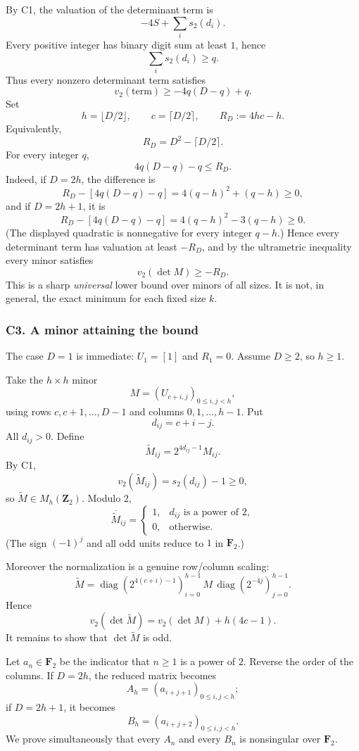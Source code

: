 \documentclass[
  10pt,
  letterpaper,
]{article}
\theoremstyle{definition}
\theoremstyle{remark}
\begin{document}
By C1, the valuation of the determinant term is \[
-4S+\sum_i s_2(d_i).
\] Every positive integer has binary digit sum at least \(1\), hence \[
\sum_i s_2(d_i)\ge q.
\] Thus every nonzero determinant term satisfies \[
v_2(\text{term})
\ge -4q(D-q)+q.
\] Set \[
h=\lfloor D/2\rfloor,
\qquad c=\lceil D/2\rceil,
\qquad
R_D:=4hc-h.
\] Equivalently, \[
\boxed{R_D=D^2-\lceil D/2\rceil.}
\] For every integer \(q\), \[
4q(D-q)-q\le R_D.
\] Indeed, if \(D=2h\), the difference is \[
R_D-[4q(D-q)-q]
=4(q-h)^2+(q-h)\ge0,
\] and if \(D=2h+1\), it is \[
R_D-[4q(D-q)-q]
=4(q-h)^2-3(q-h)\ge0.
\] (The displayed quadratic is nonnegative for every integer \(q-h\).)
Hence every determinant term has valuation at least \(-R_D\), and by the
ultrametric inequality every minor satisfies \[
\boxed{
v_2(\det M)\ge -R_D.
}
\] This is a sharp \emph{universal} lower bound over minors of all
sizes. It is not, in general, the exact minimum for each fixed size
\(k\).

\subsubsection{C3. A minor attaining the
bound}\label{c3.-a-minor-attaining-the-bound}

The case \(D=1\) is immediate: \(U_1=[1]\) and \(R_1=0\). Assume
\(D\ge2\), so \(h\ge1\).

Take the \(h\times h\) minor \[
M=(U_{c+i,j})_{0\le i,j<h},
\] using rows \(c,c+1,\ldots,D-1\) and columns \(0,1,\ldots,h-1\). Put
\[
d_{ij}=c+i-j.
\] All \(d_{ij}>0\). Define \[
\widetilde M_{ij}=2^{4d_{ij}-1}M_{ij}.
\] By C1, \[
v_2(\widetilde M_{ij})=s_2(d_{ij})-1\ge0,
\] so \(\widetilde M\in M_h(\mathbf Z_2)\). Modulo \(2\), \[
\overline{\widetilde M}_{ij}
=
\begin{cases}
1,&d_{ij}\text{ is a power of }2,\\
0,&\text{otherwise}.
\end{cases}
\] (The sign \((-1)^j\) and all odd units reduce to \(1\) in
\(\mathbf F_2\).)

Moreover the normalization is a genuine row/column scaling: \[
\widetilde M
=
\operatorname{diag}(2^{4(c+i)-1})_{i=0}^{h-1}
\,M\,
\operatorname{diag}(2^{-4j})_{j=0}^{h-1}.
\] Hence \[
v_2(\det\widetilde M)
=
v_2(\det M)+h(4c-1).
\] It remains to show that \(\det\widetilde M\) is odd.

Let \(a_n\in\mathbf F_2\) be the indicator that \(n\ge1\) is a power of
\(2\). Reverse the order of the columns. If \(D=2h\), the reduced matrix
becomes \[
A_h=(a_{i+j+1})_{0\le i,j<h};
\] if \(D=2h+1\), it becomes \[
B_h=(a_{i+j+2})_{0\le i,j<h}.
\] We prove simultaneously that every \(A_n\) and every \(B_n\) is
nonsingular over \(\mathbf F_2\).
\end{document}
